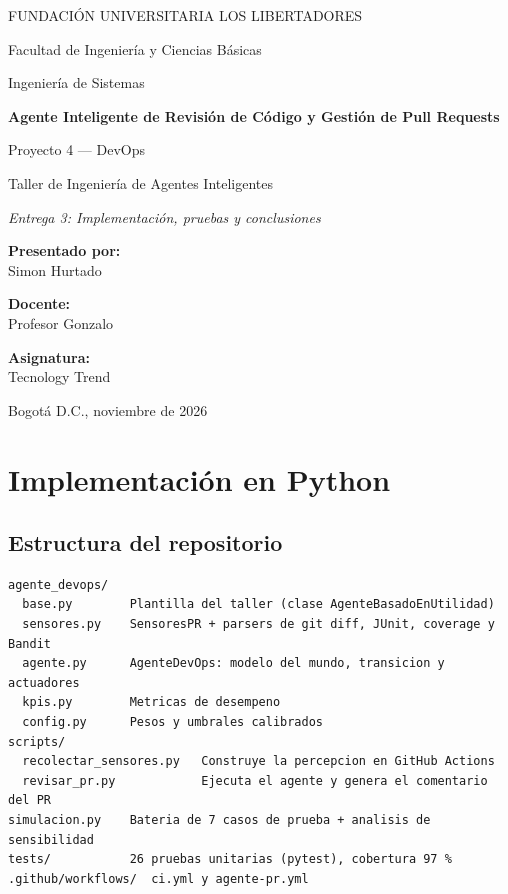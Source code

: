 \documentclass[11pt,a4paper]{article}
\begin{document}
\sloppy

\begin{titlepage}
\centering
{\large FUNDACIÓN UNIVERSITARIA LOS LIBERTADORES\par}
{\large Facultad de Ingeniería y Ciencias Básicas\par}
{\large Ingeniería de Sistemas\par}
\vspace{3cm}
{\Huge\bfseries Agente Inteligente de Revisión de Código y Gestión de Pull Requests\par}
\vspace{0.6cm}
{\Large Proyecto 4 --- DevOps\par}
\vspace{0.4cm}
{\large Taller de Ingeniería de Agentes Inteligentes\par}
\vspace{0.3cm}
{\large\itshape Entrega 3: Implementación, pruebas y conclusiones\par}
\vspace{3cm}
{\large\textbf{Presentado por:}\\ Simon Hurtado\par}
\vspace{0.8cm}
{\large\textbf{Docente:}\\ Profesor Gonzalo\par}
\vspace{0.8cm}
{\large\textbf{Asignatura:}\\ Tecnology Trend\par}
\vfill
{\large Bogotá D.C., noviembre de 2026\par}
\end{titlepage}

\tableofcontents
\newpage
\setcounter{section}{4}\setcounter{figure}{2}\setcounter{table}{4}\setcounter{equation}{4}
\section{Implementación en Python}

\subsection{Estructura del repositorio}

\begin{lstlisting}[language={}, numbers=none]
agente_devops/
  base.py        Plantilla del taller (clase AgenteBasadoEnUtilidad)
  sensores.py    SensoresPR + parsers de git diff, JUnit, coverage y Bandit
  agente.py      AgenteDevOps: modelo del mundo, transicion y actuadores
  kpis.py        Metricas de desempeno
  config.py      Pesos y umbrales calibrados
scripts/
  recolectar_sensores.py   Construye la percepcion en GitHub Actions
  revisar_pr.py            Ejecuta el agente y genera el comentario del PR
simulacion.py    Bateria de 7 casos de prueba + analisis de sensibilidad
tests/           26 pruebas unitarias (pytest), cobertura 97 %
.github/workflows/  ci.yml y agente-pr.yml
\end{lstlisting}
\end{document}
